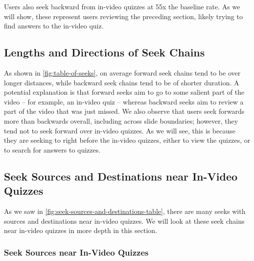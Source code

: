 \documentclass{sigchi}
\begin{document}
Users also seek backward from in-video quizzes at 55x the baseline rate. As we will show, these represent users reviewing the preceding section, likely trying to find answers to the in-video quiz.





\subsection{Lengths and Directions of Seek Chains}

As shown in \autoref{fig:table-of-seeks}, on average forward seek chains tend to be over longer distances, while backward seek chains tend to be of shorter duration. A potential explanation is that forward seeks aim to go to some salient part of the video -- for example, an in-video quiz -- whereas backward seeks aim to review a part of the video that was just missed. We also observe that users seek forwards more than backwards overall, including across slide boundaries; however, they tend not to seek forward over in-video quizzes. As we will see, this is because they are seeking to right before the in-video quizzes, either to view the quizzes, or to search for answers to quizzes. %

\subsection{Seek Sources and Destinations near In-Video Quizzes}

As we saw in \autoref{fig:seek-sources-and-destinations-table}, there are many seeks with sources and destinations near in-video quizzes. We will look at these seek chains near in-video quizzes in more depth in this section.

\subsubsection{Seek Sources near In-Video Quizzes}
\end{document}
